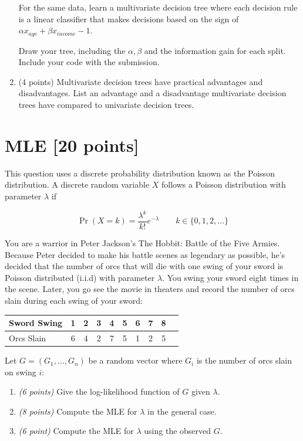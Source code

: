 \documentclass[letterpaper]{article}
\begin{document}
\begin{enumerate}
  	For the same data, learn a multivariate decision tree where each decision rule is a linear classifier that
  	makes decisions based on the sign of $\alpha x_{age} + \beta x_{income} - 1$.
  	
  	Draw your tree, including the $\alpha, \beta$ and the information gain for each split. Include your code with the submission.
  \item{(4 points)}
  	Multivariate decision trees have practical advantages and disadvantages.  List an advantage and a disadvantage
  	multivariate decision trees have compared to univariate decision trees.
  	 
\end{enumerate}

\section{MLE [20 points]}
This question uses a discrete probability distribution known as the Poisson
distribution. A discrete random variable $X$ follows a Poisson distribution
with parameter $\lambda$ if 

\[
\Pr(X=k)=\frac{\lambda^k}{k!}e^{-\lambda}\qquad
k \in \{0,1,2,\dots\}
\]

\noindent
You are a warrior in Peter Jackson's The Hobbit: Battle of the Five Armies. 
Because Peter decided to make his battle scenes as legendary as possible, 
he's decided that the number of orcs that will die with one swing of your sword is Poisson distributed (i.i.d) with parameter
$\lambda$. You swing your sword eight times in the scene. Later, you go see the movie in theaters
and record the number of orcs slain during each swing of your sword:

\begin{center}
\begin{tabular}{l*{8}{c}r}
Sword Swing         & 1 & 2 & 3 & 4 & 5 & 6 & 7 & 8 \\
\hline
Orcs Slain      & 6 & 4 & 2 & 7 & 5 & 1 & 2 & 5\\
\end{tabular}
\end{center}

\noindent
Let $G=(G_1,\dots,G_n)$ be a random vector where $G_i$ is the number
of orcs slain on swing $i$:

\begin{enumerate}
\item \emph{(6 points)} 
Give the log-likelihood function of $G$ given $\lambda$.
\item \emph{(8 points)} 
Compute the MLE for $\lambda$ in the general case.
\item \emph{(6 point)} 
Compute the MLE for $\lambda$ using the observed $G$.
\end{enumerate}
\end{document}
